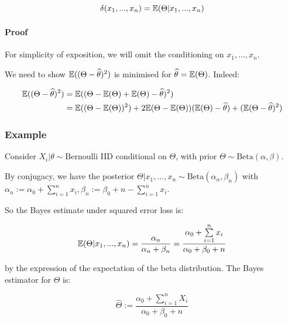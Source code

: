 \documentclass[a4paper]{article}
\begin{document}
                \[
                    \delta(x_1, ..., x_n) = \mathbb{E}(\Theta | x_1, ..., x_n)
                \]

                \paragraph{Proof}
                    For simplicity of exposition, we will omit the conditioning
                    on $x_1, ..., x_n$.

                    We need to show $\mathbb{E}((\Theta - \widehat \theta)^2)$ is
                    minimised for $\widehat \theta = \mathbb{E}(\Theta)$. Indeed:

                    \begin{align*}
                        \mathbb{E}((\Theta - \widehat \theta)^2) & = \mathbb{E}((\Theta -
                            \mathbb{E}(\Theta) + \mathbb{E}(\Theta) - \widehat \theta)^2) \\
                        & = \mathbb{E}((\Theta - \mathbb{E}(\Theta))^2) + 2\mathbb{E}(\Theta -
                            \mathbb{E}(\Theta))(\mathbb{E}(\Theta) - \widehat \theta) +
                            (\mathbb{E}(\Theta - \widehat \theta)^2)
                    \end{align*}

            \subsubsection{Example}
                Consider $X_i | \theta \sim \text{Bernoulli}$ IID conditional on
                $\Theta$, with prior $\Theta \sim \text{Beta}(\alpha, \beta)$.

                By conjugacy, we have the posterior $\Theta | x_1, ..., x_n \sim
                \text{Beta}(\alpha_n, \beta_n)$ with $\alpha_n := \alpha_0 +
                \sum\limits_{i=1}^n x_i, \beta_n := \beta_0 + n -
                \sum\limits_{i=1}^n x_i$.

                So the Bayes estimate under squared error loss is:

                \[
                    \mathbb{E}(\Theta | x_1, ..., x_n) = \frac{\alpha_n}{\alpha_n +
                    \beta_n} = \frac{\alpha_0 + \sum\limits_{i=1}^n x_i}
                    {\alpha_0 + \beta_0 + n}
                \]

                by the expression of the expectation of the beta distribution.
                The Bayes estimator for $\Theta$ is:

                \[
                    \widehat \Theta := \frac{\alpha_0 + \sum\limits_{i=1}^n X_i}
                    {\alpha_0 + \beta_0 + n}
                \]
\end{document}
